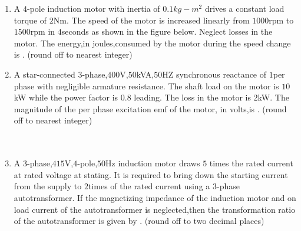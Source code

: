 \documentclass[journal]{IEEEtran}
\begin{document}
\begin {enumerate}
\item A $4$-pole induction motor with inertia of $0.1kg-m^2$ drives a constant load torque of $2$Nm. The speed of the motor is increased linearly from $1000$rpm to $1500$rpm in $4$seconds as shown in the figure below. Neglect losses in the motor. The energy,in joules,consumed by the motor during the speed change is \underline{\hspace{2cm}}. (round off to nearest integer)\\ 

\begin{figure}[!ht]
\centering
{}%

\end{figure} 

\item A star-connected $3$-phase,$400$V,$50$kVA,$50$HZ synchronous reactance of $1$\ohm per phase with negligible armature resistance. The shaft load on the motor is $10$kW while the power factor is $0.8$ leading. The loss in the motor is $2$kW. The magnitude of the per phase excitation emf of the motor, in volts,is \underline{\hspace{2cm}}. (round off to nearest integer) \\ \\ \\

\item A $3$-phase,$415$V,$4$-pole,$50$Hz induction motor draws $5$ times the rated current at rated voltage at stating. It is required to bring down the starting current from the supply to $2$times of the rated current using a $3$-phase autotransformer. If the magnetizing impedance of the induction motor and on load current of the autotransformer is neglected,then the transformation ratio of the autotransformer is given by \underline{\hspace{2cm}}. (round off to two decimal places)  





\end {enumerate}


\renewcommand{\thefigure}{\theenumi}
\renewcommand{\thetable}{\theenumi}

\end{document}
